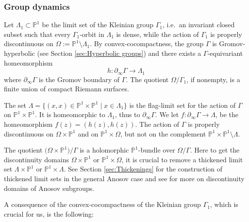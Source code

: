 \documentclass[12pt]{amsbook}%
\theoremstyle{definition}
\theoremstyle{remark}
\numberwithin{section}{chapter}
\numberwithin{subsection}{section}
\numberwithin{figure}{chapter}
\newcommand\bac[1]{{\color{blue} #1} }
\def\bP{{\mathbb{P}}}
\def\Ga{\Gamma}
\def\La{\Lambda}
\def\la{\lambda}
\def\geo{\partial_\infty}
\def\mini{\scriptsize}
\def\kap{}
\begin{document}
{{%


\subsubsection{Group dynamics}

Let $\Lambda_1\subset \bP^1$ be the limit set of the Kleinian group $\Gamma_1$, i.e.\ an invariant closed subset such that every $\Gamma_1$-orbit in $\Lambda_1$ is dense, while the action of $\Gamma_1$ is properly discontinuous on $\Omega:=\bP^1\setminus \Lambda_1$. By convex-cocompactness, 
the group $\Gamma$ is Gromov-hyperbolic (see Section \ref{sec:Hyperbolic groups}) 
and there exists a $\Gamma$-equivariant homeomorphism 
\[
h:\partial_\infty \Gamma\rightarrow \Lambda_1
\]
where $\geo \Gamma$ is the Gromov boundary of $\Gamma$. 
The quotient $\Omega/\Gamma_1$, if nonempty, is a finite union of compact Riemann surfaces.

The set $\Lambda=\{(x,x)\in \bP^1\times \bP^1\mid x\in \Lambda_1\}$ is the flag-limit set for the action of 
$\Gamma$ on $\bP^1\times\bP^1$. 
It is homeomorphic to $\Lambda_1$, thus to $\geo \Gamma$. We let $f: \geo \Ga \to \La$, be the homeomorphism $f(z)=(h(z), h(z))$. 
The action of $\Gamma$ is properly discontinuous on $\Omega\times \bP^1$ and 
on $\bP^1\times \Omega$, but not on the complement $\bP^1\times \bP^1\setminus \Lambda$. 

The quotient $\big(\Omega\times \bP^1\big)/\Gamma$ is a holomorphic $\bP^1$-bundle over $\Omega/\Gamma$. Here to get the discontinuity domains $\Omega\times \bP^1$ or $\bP^1\times \Omega$, it is crucial to remove a thickened limit set $\Lambda\times \bP^1$ or $\bP^1\times \Lambda$. See Section \ref{sec:Thickenings} for the construction of thickened limit sets in the general Anosov case and see \cite{KLP18A} for more on discontinuity domains of Anosov subgroups.

\medskip
A consequence of the convex-cocompactness of the Kleinian group $\Gamma_1$, which is crucial for us, is the following:

}}
\end{document}
